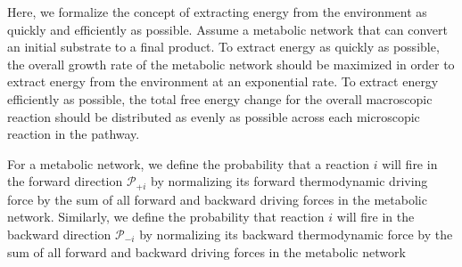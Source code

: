 Here, we formalize the concept of extracting energy from the environment as quickly and efficiently as possible. Assume a metabolic network that can convert an initial substrate to a final product. To extract energy as quickly as possible, the overall growth rate of the metabolic network should be maximized in order to extract energy from the environment at an exponential rate.   To extract energy efficiently as possible, the total free energy change for the overall macroscopic reaction should be distributed as evenly as possible across each microscopic reaction in the pathway.


For a metabolic network, we define the probability that a reaction $i$ will fire in the forward  direction ${\mathcal P_{+i}}$ by normalizing its forward thermodynamic driving force by the sum of all forward and backward driving forces in the metabolic network. Similarly, we define the probability that reaction $i$ will fire in the backward direction $\mathcal P_{-i}$ by normalizing its backward thermodynamic force by  the sum of all forward and backward driving forces in the metabolic network
